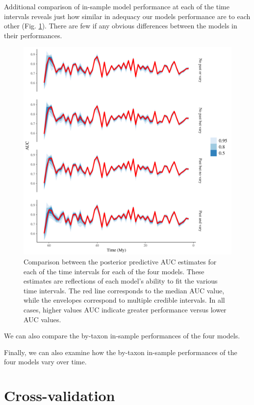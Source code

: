 \documentclass[12pt,letterpaper]{article}
\begin{document}
Additional comparison of in-sample model performance at each of the time intervals reveals just how similar in adequacy our models performance are to each other (Fig. \ref{fig:roc_ts}). There are few if any obvious differences between the models in their performances.
\begin{figure}[ht]
  \centering
  \includegraphics[width=\textwidth,height=0.5\textheight,keepaspectratio=true]{../results/figure/roc_ts}
  \caption{Comparison between the posterior predictive AUC estimates for each of the time intervals for each of the four models. These estimates are reflections of each model's ability to fit the various time intervals. The red line corresponds to the median AUC value, while the envelopes correspond to multiple credible intervals. In all cases, higher values AUC indicate greater performance versus lower AUC values.}
  \label{fig:roc_ts}
\end{figure}

We can also compare the by-taxon in-sample performances of the four models. 


Finally, we can also examine how the by-taxon in-sample performances of the four models vary over time.




\section{Cross-validation}
\end{document}

